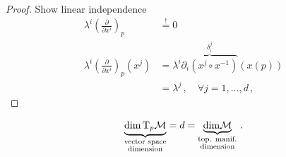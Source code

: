 \documentclass[11pt, a4paper, twocolumn]{article} %
\begin{document}
\noindent
\begin{proof}
    Show linear independence 
    \begin{align}
        \lambda^i\left( \frac{\partial}{\partial x^i} \right)_p &\stackrel{!}{=} 0\\
        \lambda^i\left( \frac{\partial}{\partial x^i} \right)_p (x^j) &= 
        \lambda^i \overbrace{\partial_i(x^j\circ x^{-1})}^{\delta_i^j}(x(p)) \nonumber\\
        &= \lambda^j\,,\quad\forall j = 1,\ldots,d\,,
    \end{align}
\end{proof}
\begin{corollary}
    \begin{equation}
        \underbrace{\mathrm{dim}\T_p\M}_{\substack{\text{vector space}\\\text{dimension}}} = d = 
        \underbrace{\mathrm{dim}\M}_{\substack{\text{top. manif.}\\ \text{dimension}}}\,.
    \end{equation}
\end{corollary}
\end{document}
